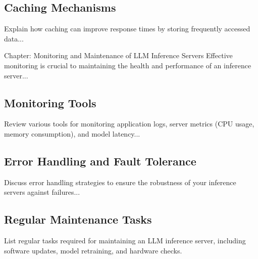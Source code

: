 \subsection{Caching Mechanisms}
Explain how caching can improve response times by storing frequently accessed data...


Chapter: Monitoring and Maintenance of LLM Inference Servers
Effective monitoring is crucial to maintaining the health and performance of an inference server...


\subsection{Monitoring Tools}
Review various tools for monitoring application logs, server metrics (CPU usage, memory consumption), and model latency...


\subsection{Error Handling and Fault Tolerance}
Discuss error handling strategies to ensure the robustness of your inference servers against failures...


\subsection{Regular Maintenance Tasks}
List regular tasks required for maintaining an LLM inference server, including software updates, model retraining, and hardware checks.